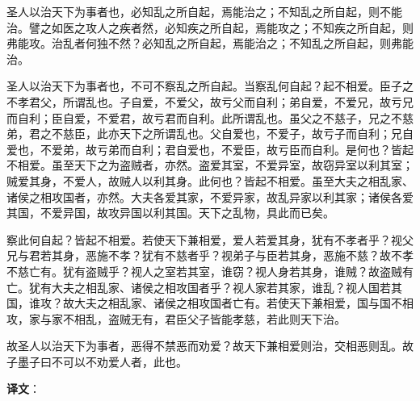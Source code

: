 \documentclass[12pt,UTF-8,openany]{ctexbook}
\begin{document}
\begin{normalsize}
    
    圣人以治天下为事者也，必知乱之所自起，焉能治之；不知乱之所自起，则不能治。譬之如医之攻人之疾者然，必知疾之所自起，焉能攻之；不知疾之所自起，则弗能攻。治乱者何独不然？必知乱之所自起，焉能治之；不知乱之所自起，则弗能治。
    
    圣人以治天下为事者也，不可不察乱之所自起。当察乱何自起？起不相爱。臣子之不孝君父，所谓乱也。子自爱，不爱父，故亏父而自利；弟自爱，不爱兄，故亏兄而自利；臣自爱，不爱君，故亏君而自利。此所谓乱也。虽父之不慈子，兄之不慈弟，君之不慈臣，此亦天下之所谓乱也。父自爱也，不爱子，故亏子而自利；兄自爱也，不爱弟，故亏弟而自利；君自爱也，不爱臣，故亏臣而自利。是何也？皆起不相爱。虽至天下之为盗贼者，亦然。盗爱其室，不爱异室，故窃异室以利其室；贼爱其身，不爱人，故贼人以利其身。此何也？皆起不相爱。虽至大夫之相乱家、诸侯之相攻国者，亦然。大夫各爱其家，不爱异家，故乱异家以利其家；诸侯各爱其国，不爱异国，故攻异国以利其国。天下之乱物，具此而已矣。
    
    察此何自起？皆起不相爱。若使天下兼相爱，爱人若爱其身，犹有不孝者乎？视父兄与君若其身，恶施不孝？犹有不慈者乎？视弟子与臣若其身，恶施不慈？故不孝不慈亡有。犹有盗贼乎？视人之室若其室，谁窃？视人身若其身，谁贼？故盗贼有亡。犹有大夫之相乱家、诸侯之相攻国者乎？视人家若其家，谁乱？视人国若其国，谁攻？故大夫之相乱家、诸侯之相攻国者亡有。若使天下兼相爱，国与国不相攻，家与家不相乱，盗贼无有，君臣父子皆能孝慈，若此则天下治。
    
    故圣人以治天下为事者，恶得不禁恶而劝爱？故天下兼相爱则治，交相恶则乱。故子墨子曰不可以不劝爱人者，此也。
\end{normalsize}


\newpage

\textbf{译文}：

\vspace{1em}
\end{document}
